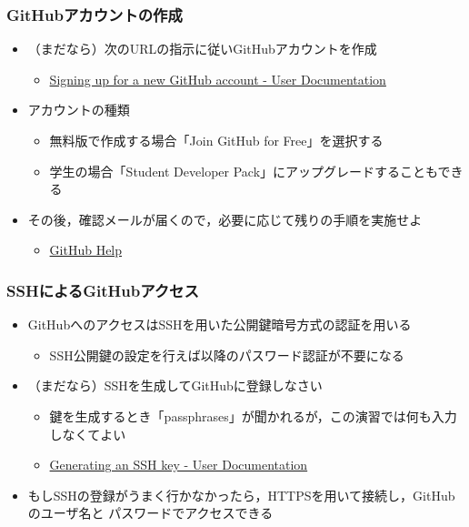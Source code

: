 \documentclass[a4paper,twoside,twocolumn]{bxjsarticle}
\begin{document}
\subsubsection{GitHubアカウントの作成}
\label{sec-2-1-2}
\begin{itemize}
\item （まだなら）次のURLの指示に従いGitHubアカウントを作成
\begin{itemize}
\item \href{https://help.github.com/articles/signing-up-for-a-new-github-account/}{Signing up for a new GitHub account - User Documentation}
\end{itemize}
\item アカウントの種類
\begin{itemize}
\item 無料版で作成する場合「Join GitHub for Free」を選択する
\item 学生の場合「Student Developer Pack」にアップグレードすることもできる
\end{itemize}
\item その後，確認メールが届くので，必要に応じて残りの手順を実施せよ
\begin{itemize}
\item \href{https://help.github.com/categories/setup/}{GitHub Help}
\end{itemize}
\end{itemize}

\subsubsection{SSHによるGitHubアクセス}
\label{sec-2-1-3}
\begin{itemize}
\item GitHubへのアクセスはSSHを用いた公開鍵暗号方式の認証を用いる
\begin{itemize}
\item SSH公開鍵の設定を行えば以降のパスワード認証が不要になる
\end{itemize}
\item （まだなら）SSHを生成してGitHubに登録しなさい
\begin{itemize}
\item 鍵を生成するとき「passphrases」が聞かれるが，この演習では何も入力しなくてよい
\item \href{https://help.github.com/articles/generating-an-ssh-key/}{Generating an SSH key - User Documentation}
\end{itemize}
\item もしSSHの登録がうまく行かなかったら，HTTPSを用いて接続し，GitHubのユーザ名と
パスワードでアクセスできる
\end{itemize}
\end{document}
